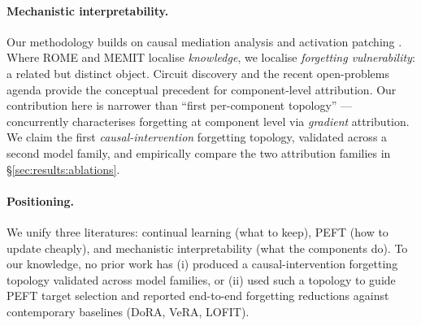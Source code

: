 \paragraph{Mechanistic interpretability.}
Our methodology builds on causal mediation analysis and activation patching \citep{vig2020causal, meng2022locating, meng2022memit, geva2023dissecting, wang2023ioi}. Where ROME and MEMIT localise \textit{knowledge}, we localise \textit{forgetting vulnerability}: a related but distinct object. Circuit discovery \citep{olsson2022incontext, elhage2021mathematical} and the recent open-problems agenda \citep{opmechinterp2025} provide the conceptual precedent for component-level attribution. Our contribution here is narrower than ``first per-component topology'' --- \citet{anon2026mechforget} concurrently characterises forgetting at component level via \textit{gradient} attribution. We claim the first \textit{causal-intervention} forgetting topology, validated across a second model family, and empirically compare the two attribution families in \S\ref{sec:results:ablations}.

\paragraph{Positioning.}
We unify three literatures: continual learning (what to keep), PEFT (how to update cheaply), and mechanistic interpretability (what the components do). To our knowledge, no prior work has (i) produced a causal-intervention forgetting topology validated across model families, or (ii) used such a topology to guide PEFT target selection and reported end-to-end forgetting reductions against contemporary baselines (DoRA, VeRA, LOFIT).
